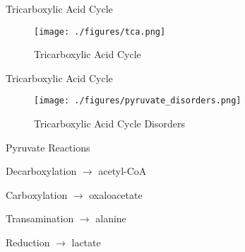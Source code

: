 \documentclass[presentation, smaller]{beamer}
\begin{document}
\begin{frame}[label={sec:org4374f12}]{Tricarboxylic Acid Cycle}
\begin{figure}[htbp]
\centering
\texttt{[image: ./figures/tca.png]}
\caption[TCA]{\label{fig:org90ebc8b}
Tricarboxylic Acid Cycle}
\end{figure}
\end{frame}

\begin{frame}[label={sec:org9296303}]{Tricarboxylic Acid Cycle}
\begin{figure}[htbp]
\centering
\texttt{[image: ./figures/pyruvate\_disorders.png]}
\caption[TCA]{\label{fig:org6c52d52}
Tricarboxylic Acid Cycle Disorders}
\end{figure}
\end{frame}

\begin{frame}[label={sec:orgb7ef521}]{Pyruvate Reactions}
\begin{block}{Decarboxylation \(\to\) acetyl-CoA}
\end{block}

\begin{block}{Carboxylation \(\to\) oxaloacetate}
\end{block}

\begin{block}{Transamination \(\to\) alanine}
\end{block}

\begin{block}{Reduction \(\to\) lactate}
\end{block}
\end{frame}
\end{document}
